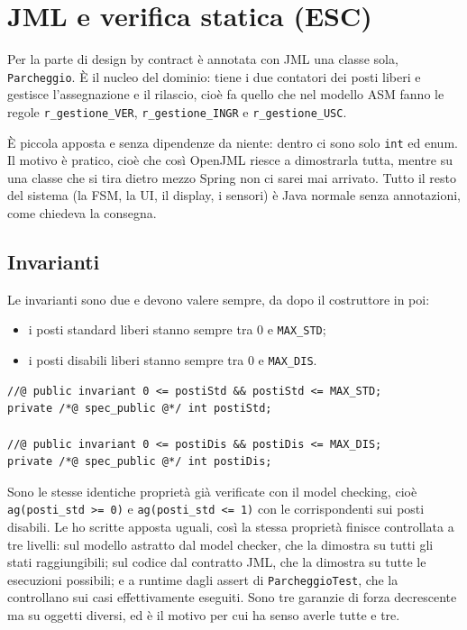 \section{JML e verifica statica (ESC)}
\label{sec:jml-ref}

Per la parte di design by contract è annotata con JML una classe sola,
\texttt{Parcheggio}. È il nucleo del dominio: tiene i due contatori dei posti liberi e
gestisce l'assegnazione e il rilascio, cioè fa quello che nel modello ASM fanno le regole
\texttt{r\_gestione\_VER}, \texttt{r\_gestione\_INGR} e \texttt{r\_gestione\_USC}.

È piccola apposta e senza dipendenze da niente: dentro ci sono solo \texttt{int} ed
enum. Il motivo è pratico, cioè che così OpenJML riesce a dimostrarla tutta, mentre su
una classe che si tira dietro mezzo Spring non ci sarei mai arrivato.
Tutto il resto del sistema (la FSM, la UI, il display, i sensori) è Java normale senza
annotazioni, come chiedeva la consegna.


\subsection{Invarianti}

Le invarianti sono due e devono valere sempre, da dopo il costruttore in poi:

\begin{itemize}
\item i posti standard liberi stanno sempre tra 0 e \texttt{MAX\_STD};
\item i posti disabili liberi stanno sempre tra 0 e \texttt{MAX\_DIS}.
\end{itemize}

\begin{lstlisting}[style=terminal, caption={Invarianti di classe}]
//@ public invariant 0 <= postiStd && postiStd <= MAX_STD;
private /*@ spec_public @*/ int postiStd;

//@ public invariant 0 <= postiDis && postiDis <= MAX_DIS;
private /*@ spec_public @*/ int postiDis;
\end{lstlisting}

Sono le stesse identiche proprietà già verificate con il model checking, cioè
\texttt{ag(posti\_std >= 0)} e \texttt{ag(posti\_std <= 1)} con le corrispondenti sui
posti disabili. Le ho scritte apposta uguali, così la stessa proprietà finisce controllata
a tre livelli: sul modello astratto dal model checker, che la dimostra su tutti gli stati
raggiungibili; sul codice dal contratto JML, che la dimostra su tutte le esecuzioni
possibili; e a runtime dagli assert di \texttt{ParcheggioTest}, che la controllano sui
casi effettivamente eseguiti. Sono tre garanzie di forza decrescente ma su oggetti
diversi, ed è il motivo per cui ha senso averle tutte e tre.

